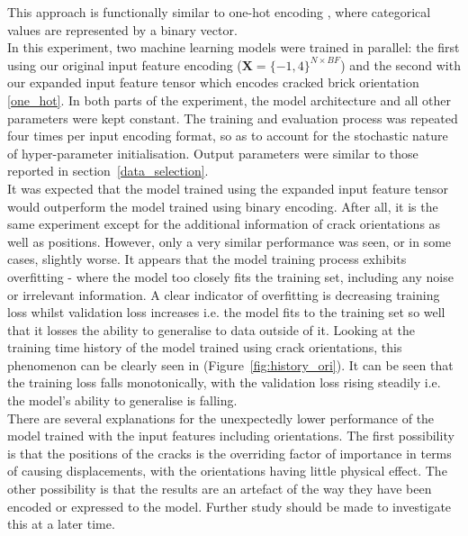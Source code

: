 \noindent This approach is functionally similar to one-hot encoding \cite{seger2018investigation}, where categorical values are represented by a binary vector. \\

\noindent
In this experiment, two machine learning models were trained in parallel: the first using our original input feature encoding ($\textbf{X} = \{-1, 4\}^{N \times BF}$) and the second with our expanded input feature tensor which encodes cracked brick orientation \ref{one_hot}. In both parts of the experiment, the model architecture and all other parameters were kept constant.  The training and evaluation process was repeated four times per input encoding format, so as to account for the stochastic nature of hyper-parameter initialisation. Output parameters were similar to those reported in section~\ref{data_selection}.
\\

\noindent It was expected that the model trained using the expanded input feature tensor would outperform  the model trained using binary encoding.  After all, it is the same experiment except for the additional information of crack orientations as well as positions. However, only a very similar performance was seen, or in some cases, slightly worse. It appears that the model training process exhibits overfitting - where the model too closely fits the training set, including any noise or irrelevant information.  A clear indicator of overfitting is decreasing training loss whilst validation loss increases i.e. the model fits to the training set so well that it losses the ability to generalise to data outside of it. Looking at the training time history of the model trained using crack orientations, this phenomenon can be clearly seen in (Figure~\ref{fig:history_ori}). It can be seen that the training loss falls monotonically, with the validation loss rising steadily i.e. the model's ability to generalise is falling. \\

\noindent There are several explanations for the unexpectedly lower performance of the model trained with the input features including orientations. The first possibility is that the positions of the cracks is the overriding factor of importance in terms of causing displacements, with the orientations having little physical effect. The other possibility is that the results are an artefact of the way they have been encoded or expressed to the model. Further study should be made to investigate this at a later time.

